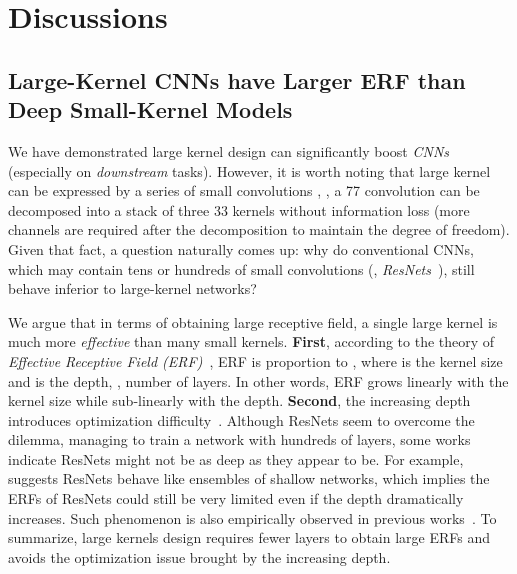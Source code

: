 \documentclass[10pt,twocolumn,letterpaper]{article}
\begin{document}
	
	\section{Discussions}
	\label{sec:largeerf}
	
	\subsection{Large-Kernel CNNs have Larger ERF than Deep Small-Kernel Models}
	
	We have demonstrated large kernel design can significantly boost \emph{CNNs} (especially on \emph{downstream} tasks). However, it is worth noting that large kernel can be expressed by a series of small convolutions \cite{simonyan2014very}, \eg, a 77 convolution can be decomposed into a stack of three 33 kernels without information loss (more channels are required after the decomposition to maintain the degree of freedom). Given that fact, a question naturally comes up: why do conventional CNNs, which may contain tens or hundreds of small convolutions (\eg, \emph{ResNets}~\cite{he2016deep}), still behave inferior to large-kernel networks?
	
	We argue that in terms of obtaining large receptive field, a single large kernel is much more \emph{effective} than many small kernels. \textbf{First}, according to the theory of \emph{Effective Receptive Field (ERF)}~\cite{erf}, ERF is proportion to , where  is the kernel size and  is the depth, \ie, number of layers. In other words, ERF grows linearly with the kernel size while sub-linearly with the depth. \textbf{Second}, the increasing depth introduces optimization difficulty~\cite{he2016deep}. Although ResNets seem to overcome the dilemma, managing to train a network with hundreds of layers, some works~\cite{veit2016residual,de2020batch} indicate ResNets might not be as deep as they appear to be. For example, \cite{veit2016residual} suggests ResNets behave like ensembles of shallow networks, which implies the ERFs of ResNets could still be very limited even if the depth dramatically increases. Such phenomenon is also empirically observed in previous works~\cite{kim2021dead}. To summarize, large kernels design requires fewer layers to obtain large ERFs and avoids the optimization issue brought by the increasing depth. 
\end{document}
